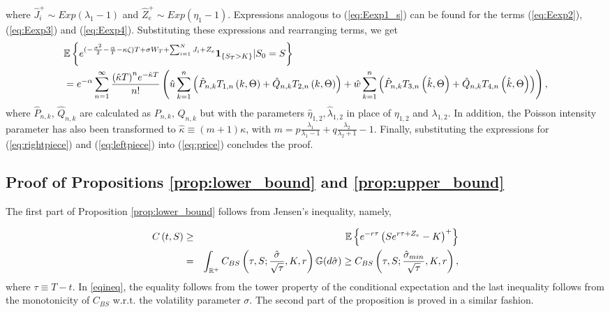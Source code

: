 \documentclass[11pt]{article}
\numberwithin{equation}{section}
\numberwithin{theorem}{section}
\def\G{\mathbb{G}}
\begin{document}
where $\hat{J}_{i}^{+}\sim Exp\left(\lambda_{1}-1\right)$ and $\hat{Z}_{e}^{+}\sim Exp\left(\eta_{1}-1\right)$.
Expressions analogous to (\ref{eq:Eexp1_s}) can be found for the  terms (\ref{eq:Eexp2}), (\ref{eq:Eexp3}) and (\ref{eq:Eexp4}).  Substituting these expressions and rearranging terms, we get
\begin{align*}
 &\mathbb{E}\left\{ e^{(-\frac{\sigma^2}{2}-\frac{\alpha}{T}-\kappa\zeta)T+\sigma W_{T}+\sum_{i=1}^{N}J_{i}+Z_{e}}\mathbf{1}_{\{S_{T}>K\}}\vert S_0=S\right\} \\
 & =   e^{-\alpha}\sum_{n=1}^{\infty}\frac{\mbox{\ensuremath{\left(\hat{\kappa}T\right)}}^{n}e^{-\hat{\kappa}T}}{n!}\left(\hat{u}\sum_{k=1}^{n}\left(\hat{P}_{n,k}T_{1,n}\left(k,\Theta\right)+\hat{Q}_{n,k}T_{2,n}\left(k,\Theta\right)\right)+\hat{w}\sum_{k=1}^{n}\left(\hat{P}_{n,k}T_{3,n}\left(\hat{k},\Theta\right)+\hat{Q}_{n,k}T_{4,n}\left(\hat{k},\Theta\right)\right)\right),
\end{align*}
 where $\hat{P}_{n,k}$, $\hat{Q}_{n,k}$ are calculated as $P_{n,k}$,
$Q_{n,k}$ but with the parameters $\hat{\eta}_{1,2},\hat{\lambda}_{1,2}$
in place of $\eta_{1,2}$ and $\lambda_{1,2}$. In addition,  the Poisson intensity parameter has also been transformed to $\hat{\kappa}\equiv (m+1)\kappa$, with $m=p\frac{\lambda_1}{\lambda_1-1}+q\frac{\lambda_2}{\lambda_2+1}-1$. Finally, substituting the expressions  for (\ref{eq:rightpiece}) and (\ref{eq:leftpiece}) into  (\ref{eq:price}) concludes the proof.

\subsection{Proof of Propositions \ref{prop:lower_bound} and \ref{prop:upper_bound}}
The first part of Proposition \ref{prop:lower_bound} follows from   Jensen's inequality, namely, 
 
\begin{eqnarray}
C\left(t,S\right) & \geq & \mathbb{E}\left\{ e^{-r\tau}\left(Se^{r\tau+Z_{e}}-K\right)^{+}\right\}  \notag\\
 & = & \int_{\mathbb{R}^{+}}C_{BS}\left(\tau,S;\frac{\hat{\sigma}}{\sqrt{\tau}},K,r\right)\G\text{\ensuremath{\left(d\hat{\sigma}\right)}}
  \geq  C_{BS}\left(\tau,S;\frac{\hat{\sigma}_{min}}{\sqrt{\tau}},K,r\right),\label{eqineq}
\end{eqnarray}
where $\tau\equiv T-t$. In \eqref{eqineq}, the  equality follows from the tower property of the conditional
expectation and the last inequality follows from the monotonicity
of $C_{BS}$ w.r.t. the volatility parameter $\sigma$. The second part of the proposition is proved
in a similar fashion.
\end{document}
